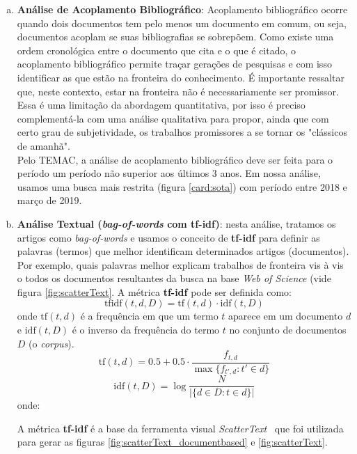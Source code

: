 \documentclass[sigconf]{acmart}
\begin{document}
\begin{enumerate}[a)]
  \item{\textbf{Análise de Acoplamento Bibliográfico}: Acoplamento bibliográfico ocorre quando dois documentos tem pelo menos um documento em comum, ou seja, documentos acoplam se suas bibliografias se sobrepõem. Como existe uma ordem cronológica entre o documento que cita e o que é citado, o acoplamento bibliográfico permite traçar gerações de pesquisas e com isso identificar as que estão na fronteira do conhecimento.  É importante ressaltar que, neste contexto, estar na fronteira não é necessariamente ser promissor. Essa é uma limitação da abordagem quantitativa, por isso é preciso complementá-la com uma análise qualitativa para propor, ainda que com certo grau de subjetividade, os trabalhos promissores a se tornar os "clássicos de amanhã". \\Pelo TEMAC, a análise de acoplamento bibliográfico deve ser feita para o período um período não superior aos últimos 3 anos. Em nossa análise, usamos uma busca mais restrita (figura \ref{card:sota}) com período entre 2018 e março de 2019.
  }
  \item{\textbf{Análise Textual (\emph{bag-of-words}  com tf-idf)}: nesta análise, tratamos os artigos como \emph{bag-of-words} e usamos o conceito de \textbf{tf-idf} para definir as palavras (termos) que melhor identificam determinados artigos (documentos). Por exemplo, quais palavras melhor explicam trabalhos de fronteira vis à vis o todos os documentos resultantes da busca na base \emph{Web of Science} (vide figura \ref{fig:scatterText}. A métrica \textbf{tf-idf} pode ser definida como:
  \begin{equation}
    \mathrm{tfidf}(t,d,D) = \mathrm{tf}(t,d) \cdot \mathrm{idf}(t, D)
  \end{equation}
  onde $\mathrm{tf}(t,d)$ é a frequência em que um termo $t$ aparece em um documento $d$ e $\mathrm{idf}(t, D)$ é o inverso da frequência do termo $t$ no conjunto de documentos $D$ (o \emph{corpus}). 
  \begin{equation}
    \mathrm{tf}(t,d) = 0.5 + 0.5 \cdot  \frac{f_{t, d}}{\max\{f_{t', d}:t' \in d\}}
  \end{equation}
  \begin{equation}
    \mathrm{idf}(t, D) =  \log \frac{N}{|\{d \in D: t \in d\}|}
  \end{equation}
  onde:
  
  A métrica \textbf{tf-idf} é a base da ferramenta visual \emph{ScatterText}~\cite{kessler2017scattertext} que foi utilizada para gerar as figuras \ref{fig:scatterText_documentbased} e \ref{fig:scatterText}.

  }\label{analiseTextual}
\end{enumerate}
\end{document}
